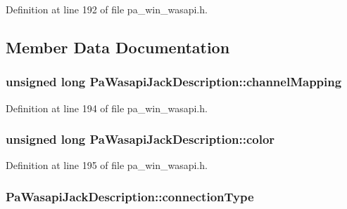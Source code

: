 Definition at line 192 of file pa\+\_\+win\+\_\+wasapi.\+h.



\subsection{Member Data Documentation}
\subsubsection[{\texorpdfstring{channel\+Mapping}{channelMapping}}]{\setlength{\rightskip}{0pt plus 5cm}unsigned long Pa\+Wasapi\+Jack\+Description\+::channel\+Mapping}\hypertarget{struct_pa_wasapi_jack_description_afc8865aab64ab827315a7ce645b627f4}{}\label{struct_pa_wasapi_jack_description_afc8865aab64ab827315a7ce645b627f4}


Definition at line 194 of file pa\+\_\+win\+\_\+wasapi.\+h.

\subsubsection[{\texorpdfstring{color}{color}}]{\setlength{\rightskip}{0pt plus 5cm}unsigned long Pa\+Wasapi\+Jack\+Description\+::color}\hypertarget{struct_pa_wasapi_jack_description_a2a0d9cd5e745192482afeda572941d15}{}\label{struct_pa_wasapi_jack_description_a2a0d9cd5e745192482afeda572941d15}


Definition at line 195 of file pa\+\_\+win\+\_\+wasapi.\+h.

\subsubsection[{\texorpdfstring{connection\+Type}{connectionType}}]{ Pa\+Wasapi\+Jack\+Description\+::connection\+Type}\hypertarget{struct_pa_wasapi_jack_description_ae9fd6f09268cc8d3c510965305025a7e}{}\label{struct_pa_wasapi_jack_description_ae9fd6f09268cc8d3c510965305025a7e}


